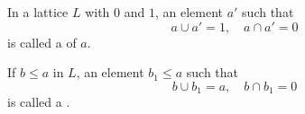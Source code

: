 In a lattice $L$ with $0$ and $1$, an element $a'$ such that
$$a \cup a' = 1, \quad a \cap a' = 0$$
is called a  of $a$.

If $b \leq a$ in $L$, an element $b_1 \leq a$ such that
$$b \cup b_1 = a, \quad b \cap b_1 = 0$$
is called a .

